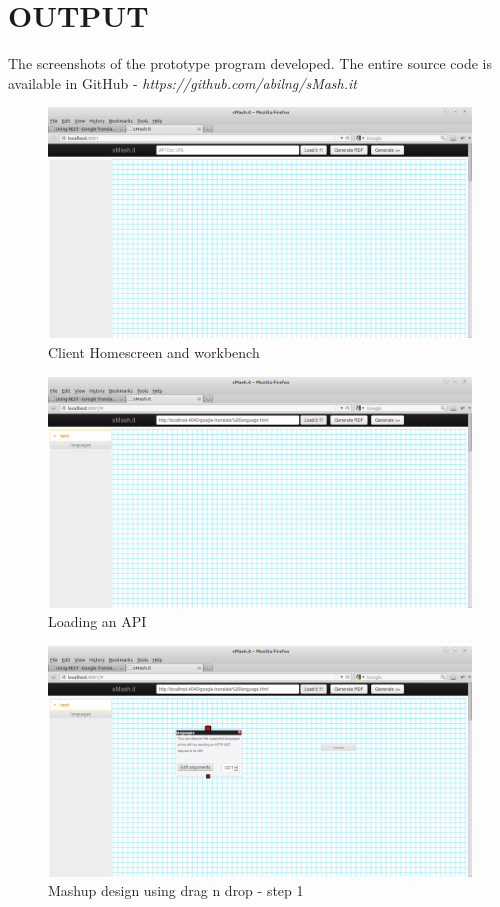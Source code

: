 \chapter{OUTPUT}

The screenshots of the prototype program developed. The entire source code is available in GitHub - {\it https://github.com/abilng/sMash.it}

\begin{figure}
        \centering
        \includegraphics[scale=0.3]{images/7.png}
        \caption{Client Homescreen and workbench}
\end{figure}

\begin{figure}
        \centering
        \includegraphics[scale=0.3]{images/6.png}
        \caption{Loading an API}
\end{figure}


\begin{figure}
        \centering
        \includegraphics[scale=0.3]{images/5.png}
        \caption{Mashup design using drag n drop - step 1}
\end{figure}

